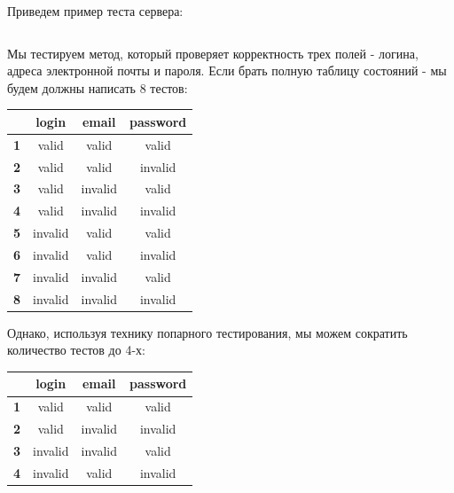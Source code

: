 \documentclass[a4paper, 14pt]{article}
\begin{document}
\begin{itemize}
    Приведем пример теста сервера:
    \normalsize
    \inputminted[frame=single]{Java}{./code/3.java}
    \large

    Мы тестируем метод, который проверяет корректность трех полей - логина, адреса электронной почты и пароля. Если брать полную таблицу состояний - мы будем должны написать 8 тестов:

    \begin{table}[H]
        \centering
        \begin{tabular}{|c|c|c|c|}
        \hline
        \textbf{}  & \textbf{login} & \textbf{email} & \textbf{password} \\ \hline
        \textbf{1} & valid          & valid          & valid             \\ \hline
        \textbf{2} & valid          & valid          & invalid           \\ \hline
        \textbf{3} & valid          & invalid        & valid             \\ \hline
        \textbf{4} & valid          & invalid        & invalid           \\ \hline
        \textbf{5} & invalid        & valid          & valid             \\ \hline
        \textbf{6} & invalid        & valid          & invalid           \\ \hline
        \textbf{7} & invalid        & invalid        & valid             \\ \hline
        \textbf{8} & invalid        & invalid        & invalid           \\ \hline
        \end{tabular}
    \end{table}

    Однако, используя технику попарного тестирования, мы можем сократить количество тестов до 4-х:
    \begin{table}[H]
        \centering
        \begin{tabular}{|c|c|c|c|}
        \hline
        \textbf{}  & \textbf{login} & \textbf{email} & \textbf{password} \\ \hline
        \textbf{1} & valid          & valid          & valid             \\ \hline
        \textbf{2} & valid          & invalid        & invalid           \\ \hline
        \textbf{3} & invalid        & invalid        & valid             \\ \hline
        \textbf{4} & invalid        & valid          & invalid           \\ \hline
        \end{tabular}
    \end{table}
\end{itemize}
\end{document}
